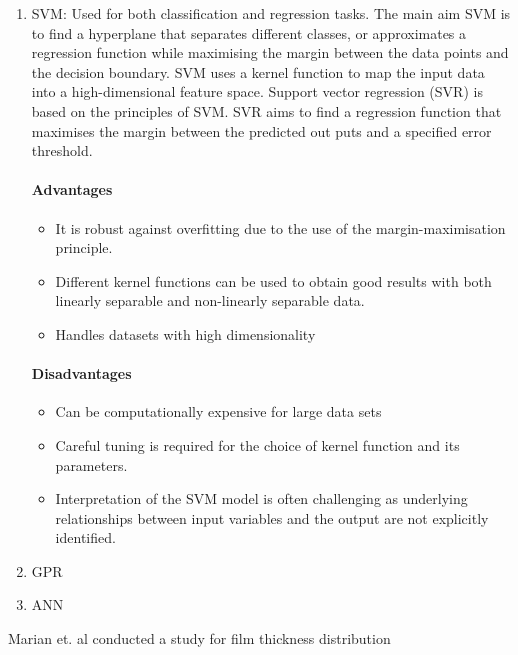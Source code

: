 \begin{enumerate} %
	\item SVM:
	Used for both classification and regression tasks. The main aim SVM is to find a hyperplane that separates different classes, or approximates a regression function while maximising the margin between the data points and the decision boundary. SVM uses a kernel function to map the input data into a high-dimensional feature space. Support vector regression (SVR) is based on the principles of SVM. SVR aims to find a regression function that maximises the margin between the predicted out puts and a specified error threshold.
	    \paragraph{Advantages}
		\begin{itemize}
			\item It is robust against overfitting due to the use of the margin-maximisation principle.
			\item Different kernel functions can be used to obtain good results with both linearly separable and non-linearly separable data.
			\item Handles datasets with high dimensionality
		\end{itemize}

		\paragraph{Disadvantages}
		\begin{itemize}
			\item Can be computationally expensive for large data sets
			\item Careful tuning is required for the choice of kernel function and its parameters.
			\item Interpretation of the SVM model is often challenging as underlying relationships between input variables and the output are not explicitly identified.
	    \end{itemize}
 
	\item GPR
	\item ANN
	
\end{enumerate}

Marian et. al conducted a study for film thickness distribution
















